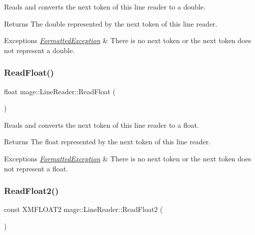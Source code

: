 Reads and converts the next token of this line reader to a {\ttfamily double}.

\begin{DoxyReturn}{Returns}
The {\ttfamily double} represented by the next token of this line reader. 
\end{DoxyReturn}

\begin{DoxyExceptions}{Exceptions}
{\em \hyperlink{structmage_1_1_formatted_exception}{Formatted\+Exception}} & There is no next token or the next token does not represent a {\ttfamily double}. \\
\hline
\end{DoxyExceptions}
\hypertarget{classmage_1_1_line_reader_ae691928873b110dd273e72a47f2008cb}{}\label{classmage_1_1_line_reader_ae691928873b110dd273e72a47f2008cb} 
\subsubsection{\texorpdfstring{Read\+Float()}{ReadFloat()}}
{\footnotesize\ttfamily float mage\+::\+Line\+Reader\+::\+Read\+Float (\begin{DoxyParamCaption}{ }\end{DoxyParamCaption})\hspace{0.3cm}{\ttfamily [protected]}}

Reads and converts the next token of this line reader to a {\ttfamily float}.

\begin{DoxyReturn}{Returns}
The {\ttfamily float} represented by the next token of this line reader. 
\end{DoxyReturn}

\begin{DoxyExceptions}{Exceptions}
{\em \hyperlink{structmage_1_1_formatted_exception}{Formatted\+Exception}} & There is no next token or the next token does not represent a {\ttfamily float}. \\
\hline
\end{DoxyExceptions}
\hypertarget{classmage_1_1_line_reader_ae33effd33fad465616e3acf8acdc408f}{}\label{classmage_1_1_line_reader_ae33effd33fad465616e3acf8acdc408f} 
\subsubsection{\texorpdfstring{Read\+Float2()}{ReadFloat2()}}
{\footnotesize\ttfamily const X\+M\+F\+L\+O\+A\+T2 mage\+::\+Line\+Reader\+::\+Read\+Float2 (\begin{DoxyParamCaption}{ }\end{DoxyParamCaption})\hspace{0.3cm}{\ttfamily [protected]}}

